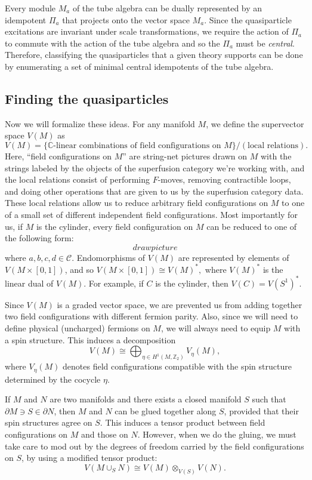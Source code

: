 \documentclass[12pt,a4paper]{article}
\newcommand{\tp}{\otimes}
\newcommand{\cc}{\mathbb{C}}
\newcommand{\zt}{\mathbb{Z}_2}
\newcommand\be            {\begin{equation}}
\newcommand\ee            {\end{equation}}
\newcommand{\mcc}{\mathcal{C}}
\newcommand{\p}{\partial}
\begin{document}
Every module $M_a$ of the tube algebra can be dually represented by an idempotent $\Pi_a$ that projects onto the vector space $M_a$. Since the quasiparticle excitations are invariant under scale transformations, we require the action of $\Pi_a$ to commute with the action of the tube algebra and so the $\Pi_a$ must be {\it central}. Therefore, classifying the quasiparticles that a given theory supports can be done by enumerating a set of minimal central idempotents of the tube algebra. 

\subsection{Finding the quasiparticles}

Now we will formalize these ideas. For any manifold $M$, we define the supervector space $V(M)$ as 
\be V(M) = \{\text{$\cc$-linear combinations of field configurations on $M$}\} / (\text{local relations}). \ee
Here, ``field configurations on $M$'' are string-net pictures drawn on $M$ with the strings labeled by the objects of the superfusion category we're working with, and the local relations consist of performing $F$-moves, removing contractible loops, and doing other operations that are given to us by the superfusion category data. These local relations allow us to reduce arbitrary field configurations on $M$ to one of a small set of different independent field configurations. Most importantly for us, if $M$ is the cylinder, every field configuration on $M$ can be reduced to one of the following form:
\be draw picture \ee
where $a,b,c,d \in \mcc$. Endomorphisms of $V(M)$ are represented by elements of $V(M\times [0,1])$, and so $V(M\times[0,1]) \cong V(M)^*,$
where $V(M)^*$ is the linear dual of $V(M)$. For example, if $C$ is the cylinder, then $V(C) = V(S^1)^*$. 

Since $V(M)$ is a graded vector space, we are prevented us from adding together two field configurations with different fermion parity. Also, since we will need to define physical (uncharged) fermions on $M$, we will always need to equip $M$ with a spin structure. This induces a decomposition 
\be V(M) \cong \bigoplus_{\eta \in H^1(M,\zt)}V_\eta(M),\ee
where $V_\eta(M)$ denotes field configurations compatible with the spin structure determined by the cocycle $\eta$. 

If $M$ and $N$ are two manifolds and there exists a closed manifold $S$ such that $\p M \ni S \in \p N$, then $M$ and $N$ can be glued together along $S$, provided that their spin structures agree on $S$. This induces a tensor product between field configurations on $M$ and those on $N$. However, when we do the gluing, we must take care to mod out by the degrees of freedom carried by the field configurations on $S$, by using a modified tensor product:
\be \label{gluing} V(M\cup_SN) \cong V(M)\tp_{V(S)} V(N).\ee
\end{document}
